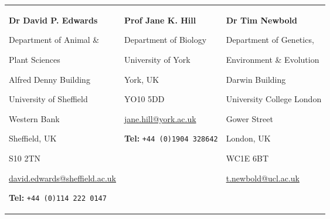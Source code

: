 

\setlength{\tabcolsep}{0.5em} %
\begin{tabular}{ p{5.6cm} p{4.6cm} p{4.6cm}}
\textbf{Dr David P. Edwards}\par
Department of Animal \& 
    \par \hspace{0.5em} Plant Sciences\par 
Alfred Denny Building\par 
University of Sheffield\par
Western Bank \par
Sheffield, UK\par
S10 2TN\par
\url{david.edwards@sheffield.ac.uk}\par
\textbf{Tel:} {\texttt{+44 (0)114 222 0147}}
& 
\textbf{Prof Jane K. Hill}\par
Department of Biology\par
University of York\par
York, UK\par
YO10 5DD\par
\url{jane.hill@york.ac.uk}\par
\textbf{Tel:} {\texttt{+44 (0)1904 328642}}
& 
\textbf{Dr Tim Newbold}\par
Department of Genetics, 
    \par \hspace{0.5em}Environment \& Evolution\par
Darwin Building\par
University College London\par
Gower Street\par
London, UK\par
WC1E 6BT\par
\url{t.newbold@ucl.ac.uk}\par
\\
\end{tabular}
